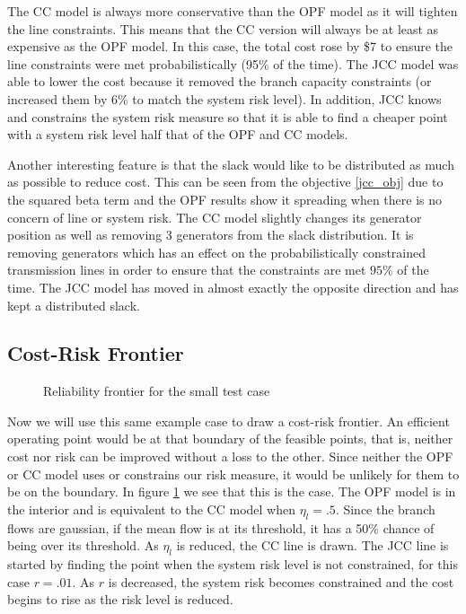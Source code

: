 The CC model is always more conservative than the OPF model as it will tighten the line constraints.  This means that the CC version will always be at least as expensive as the OPF model.  In this case, the total cost rose by \$7 to ensure the line constraints were met probabilistically (95\% of the time).  The JCC model was able to lower the cost because it removed the branch capacity constraints (or increased them by 6\% to match the system risk level).  In addition, JCC knows and constrains the system risk measure so that it is able to find a cheaper point with a system risk level half that of the OPF and CC models.



Another interesting feature is that the slack would like to be distributed as much as possible to reduce cost.  This can be seen from the objective \ref{jcc_obj} due to the squared beta term and the OPF results show it spreading when there is no concern of line or system risk.  The CC model slightly changes its generator position as well as removing 3 generators from the slack distribution.  It is removing generators which has an effect on the probabilistically constrained transmission lines in order to ensure that the constraints are met $95\%$ of the time.  The JCC model has moved in almost exactly the opposite direction and has kept a distributed slack.


\subsection{Cost-Risk Frontier}
  \begin{figure} 
\centering

\caption{Reliability frontier for the small test case}\label{costriskfront}
\end{figure}

Now we will use this same example case to draw a cost-risk frontier.  An efficient operating point would be at that boundary of the feasible points, that is, neither cost nor risk can be improved without a loss to the other.  Since neither the OPF or CC model uses or constrains our risk measure, it would be unlikely for them to be on the boundary.  In figure \ref{costriskfront} we see that this is the case.  The OPF model is in the interior and is equivalent to the CC model when $\eta_l=.5$.  Since the branch flows are gaussian, if the mean flow is at its threshold, it has a 50\% chance of being over its threshold.  As $\eta_l$ is reduced, the CC line is drawn.  The JCC line is started by finding the point when the system risk level is not constrained, for this case $r=.01$.  As $r$ is decreased, the system risk becomes constrained and the cost begins to rise as the risk level is reduced.


